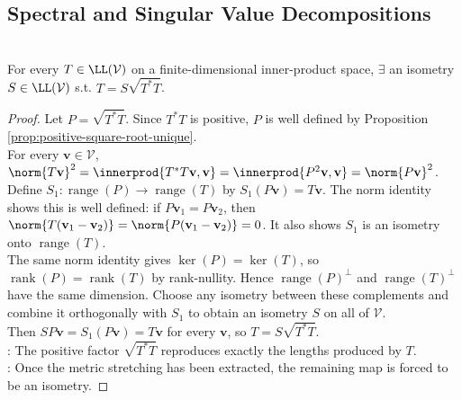 \subsection{Spectral and Singular Value Decompositions}

\begin{theorem} \label{thm:polar-decomposition} \\
For every $T\in\LL(\mathcal{V})$ on a finite-dimensional inner-product space, $\exists$ an isometry $S\in\LL(\mathcal{V})$ s.t. $T=S\sqrt{T^*T}$.
\begin{proof}
Let $P=\sqrt{T^*T}$. Since $T^*T$ is positive, $P$ is well defined by Proposition \ref{prop:positive-square-root-unique}.\\
For every $\mathbf{v}\in\mathcal{V}$, $\norm{T\mathbf{v}}^2 =\innerprod{T^*T\mathbf{v},\mathbf{v}} =\innerprod{P^2\mathbf{v},\mathbf{v}} =\norm{P\mathbf{v}}^2$.\\
Define $S_1:\operatorname{range}(P)\to\operatorname{range}(T)$ by $S_1(P\mathbf{v})=T\mathbf{v}$. The norm identity shows this is well defined: if $P\mathbf{v}_1=P\mathbf{v}_2$, then $\norm{T(\mathbf{v}_1-\mathbf{v}_2)}=\norm{P(\mathbf{v}_1-\mathbf{v}_2)}=0$. It also shows $S_1$ is an isometry onto $\operatorname{range}(T)$.\\
The same norm identity gives $\ker(P)=\ker(T)$, so $\operatorname{rank}(P)=\operatorname{rank}(T)$ by rank-nullity. Hence $\operatorname{range}(P)^{\perp}$ and $\operatorname{range}(T)^{\perp}$ have the same dimension. Choose any isometry between these complements and combine it orthogonally with $S_1$ to obtain an isometry $S$ on all of $\mathcal{V}$.\\
Then $SP\mathbf{v}=S_1(P\mathbf{v})=T\mathbf{v}$ for every $\mathbf{v}$, so $T=S\sqrt{T^*T}$.\\
: The positive factor $\sqrt{T^*T}$ reproduces exactly the lengths produced by $T$.\\
: Once the metric stretching has been extracted, the remaining map is forced to be an isometry.
\end{proof}
\end{theorem}

